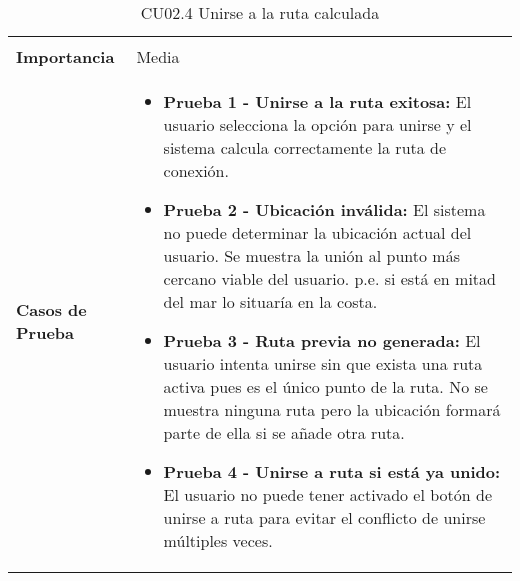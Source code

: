 \begin{table}[H]
\begin{tabularx}{\linewidth}{ p{} p{} }
\begin{itemize}
		\end{itemize}\\
		\textbf{Importancia}          & Media \\
		\textbf{Casos de Prueba}      &
		\begin{itemize}
			\item \textbf{Prueba 1 - Unirse a la ruta exitosa:} El usuario selecciona la opción para unirse y el sistema calcula correctamente la ruta de conexión.
			\vspace{2pt}
			\item \textbf{Prueba 2 - Ubicación inválida:} El sistema no puede determinar la ubicación actual del usuario. Se muestra la unión al punto más cercano viable del usuario. p.e. si está en mitad del mar lo situaría en la costa.
			\vspace{2pt}
			\item \textbf{Prueba 3 - Ruta previa no generada:} El usuario intenta unirse sin que exista una ruta activa pues es el único punto de la ruta. No se muestra ninguna ruta pero la ubicación formará parte de ella si se añade otra ruta.
			\vspace{2pt}
			\item \textbf{Prueba 4 - Unirse a ruta si está ya unido:} El usuario no puede tener activado el botón de unirse a ruta para evitar el conflicto de unirse múltiples veces.
		\end{itemize} \\
		\bottomrule
	\end{tabularx}
	\caption{CU02.4 Unirse a la ruta calculada}
	\label{cu:unirse-ruta}
\end{table}


